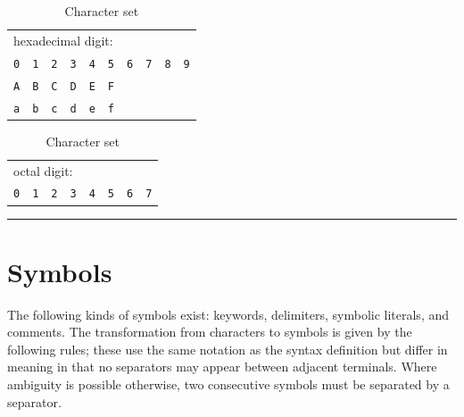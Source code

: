 \documentclass{overturerepchap}
\newcommand{\blankline}{\vspace{\baselineskip}}
\begin{document}
\begin{table}[ht]
\blankline
    \begin{tabular}{*{10}{l}}
        \multicolumn{10}{l}{hexadecimal digit:} \\
        {\tt 0} & {\tt 1} & {\tt 2} & {\tt 3} & {\tt 4} & {\tt 5} & {\tt 6} & {\tt 7} & {\tt 8} & {\tt 9} \\
        {\tt A} & {\tt B} & {\tt C} & {\tt D} & {\tt E} & {\tt F} \\
        {\tt a} & {\tt b} & {\tt c} & {\tt d} & {\tt e} & {\tt f} 
     \end{tabular}

\blankline
    \begin{tabular}{*{8}{l}}
        \multicolumn{8}{l}{octal digit:} \\
        {\tt 0}
        & {\tt 1} 
        & {\tt 2} 
        & {\tt 3} 
        & {\tt 4} 
        & {\tt 5}
        & {\tt 6} 
        & {\tt 7} 
     \end{tabular}

\rule{\textwidth}{.5mm}
\hypertarget{charSetTable}{\caption{Character set}}
\label{charSetTable}

\end{table}

        

\clearpage %


\section{Symbols}\label{Symbols}

The following kinds of symbols exist: keywords, delimiters,
symbolic literals, and comments.  The transformation from characters to
symbols is given by the following rules; these use the same notation as the
syntax definition but differ in meaning in that no separators may appear
between adjacent terminals.  Where ambiguity is possible otherwise, two
consecutive symbols must be separated by a separator.
\end{document}
